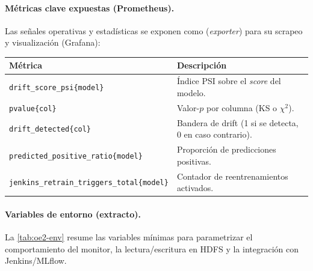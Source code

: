 \paragraph{Métricas clave expuestas (Prometheus).}
Las señales operativas y estadísticas se exponen como (\emph{exporter}) para su scrapeo y visualización (Grafana):

\begin{center}
\begin{tabular}{ll}
\toprule
\textbf{Métrica} & \textbf{Descripción} \\
\midrule
\texttt{drift\_score\_psi\{model\}} & Índice PSI sobre el \textit{score} del modelo. \\
\texttt{pvalue\{col\}} & Valor-$p$ por columna (KS o $\chi^2$). \\
\texttt{drift\_detected\{col\}} & Bandera de drift (1 si se detecta, 0 en caso contrario). \\
\texttt{predicted\_positive\_ratio\{model\}} & Proporción de predicciones positivas. \\
\texttt{jenkins\_retrain\_triggers\_total\{model\}} & Contador de reentrenamientos activados. \\
\bottomrule
\end{tabular}
\end{center}

\paragraph{Variables de entorno (extracto).}
La \autoref{tab:oe2-env} resume las variables mínimas para parametrizar el comportamiento del monitor, la lectura/escritura en HDFS y la integración con Jenkins/MLflow.


